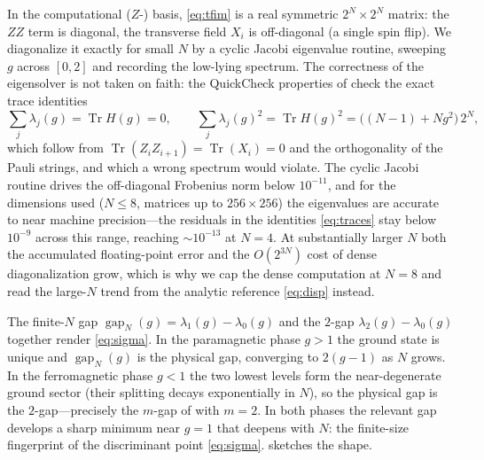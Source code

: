 \documentclass[12pt]{article}
\newcommand{\gapfin}[1]{\operatorname{gap}_{#1}}
\newcommand{\Tr}{\operatorname{Tr}}
\theoremstyle{plain}
\theoremstyle{definition}
\theoremstyle{remark}
\begin{document}
In the computational ($Z$-) basis, \eqref{eq:tfim} is a real symmetric $2^N\times 2^N$
matrix: the $ZZ$ term is diagonal, the transverse field $X_i$ is off-diagonal (a
single spin flip). We diagonalize it exactly for small $N$ by a cyclic Jacobi
eigenvalue routine, sweeping $g$ across $[0,2]$ and recording the low-lying spectrum.
The correctness of the eigensolver is not taken on faith: the QuickCheck properties of
 check the exact trace identities
\begin{equation}
\label{eq:traces}
\sum_j\lambda_j(g)=\Tr H(g)=0,
\qquad
\sum_j\lambda_j(g)^2=\Tr H(g)^2=\big((N-1)+N g^2\big)\,2^N,
\end{equation}
which follow from $\Tr(Z_iZ_{i+1})=\Tr(X_i)=0$ and the orthogonality of the Pauli
strings, and which a wrong spectrum would violate. The cyclic Jacobi routine drives
the off-diagonal Frobenius norm below $10^{-11}$, and for the dimensions used
($N\le 8$, matrices up to $256\times256$) the eigenvalues are accurate to near machine
precision---the residuals in the identities \eqref{eq:traces} stay below $10^{-9}$
across this range, reaching $\sim 10^{-13}$ at $N=4$. At substantially larger $N$ both the accumulated floating-point error and
the $O(2^{3N})$ cost of dense diagonalization grow, which is why we cap the dense
computation at $N=8$ and read the large-$N$ trend from the analytic reference
\eqref{eq:disp} instead.

The finite-$N$ gap $\gapfin{N}(g)=\lambda_1(g)-\lambda_0(g)$ and the $2$-gap
$\lambda_2(g)-\lambda_0(g)$ together render \eqref{eq:sigma}. In the paramagnetic
phase $g>1$ the ground state is unique and $\gapfin{N}(g)$ is the physical gap,
converging to $2(g-1)$ as $N$ grows. In the ferromagnetic phase $g<1$ the two lowest
levels form the near-degenerate ground sector (their splitting decays exponentially in
$N$), so the physical gap is the $2$-gap---precisely the $m$-gap of
 with $m=2$. In both phases the relevant gap develops a sharp minimum
near $g=1$ that deepens with $N$: the finite-size fingerprint of the discriminant point
\eqref{eq:sigma}.  sketches the shape.
\end{document}
